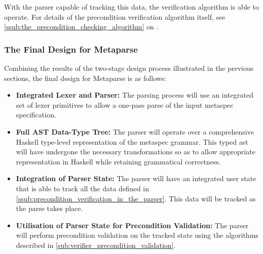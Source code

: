 With the parser capable of tracking this data, the verification algorithm is able to operate.
For details of the precondition verification algorithm itself, see \autoref{ssub:the_precondition_checking_algorithm} on .


\subsubsection{The Final Design for Metaparse} %
\label{ssub:the_final_design_for_metaparse}
Combining the results of the two-stage design process illustrated in the previous sections, the final design for Metaparse is as follows:
\begin{itemize}
    \item \textbf{Integrated Lexer and Parser:} The parsing process will use an integrated set of lexer primitives to allow a one-pass parse of the input \gls{metaspec} specification. 
    \item \textbf{Full AST Data-Type Tree:} The parser will operate over a comprehensive Haskell type-level representation of the \gls{metaspec} grammar. 
    This typed \gls{ast} will have undergone the necessary transformations so as to allow appropriate representation in Haskell while retaining grammatical correctness. 
    \item \textbf{Integration of Parser State:} The parser will have an integrated user state that is able to track all the data defined in \autoref{ssub:precondition_verification_in_the_parser}.
    This data will be tracked as the parse takes place. 
    \item \textbf{Utilisation of Parser State for Precondition Validation:}
    The parser will perform precondition validation on the tracked state using the algorithms described in \autoref{sub:verifier_precondition_validation}.
\end{itemize}



